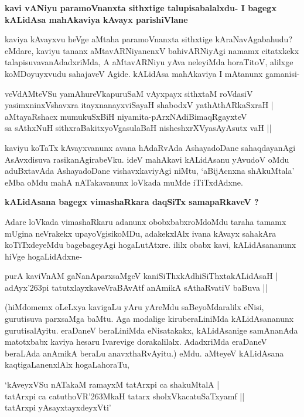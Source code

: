 \newpage
{\noindent
{\large\bf kavi vANiyu paramoVnanxta sithxtige talupisabalalxdu- I bagegx kALidAsa mahAkaviya kAvayx pari\-shiVlane}}\label{page232}
\medskip

\noindent
kaviya kAvayxvu heVge aMtaha paramoVnanxta sithxtige kAraNavAgabahudu? eMdare, kaviyu tananx aMta\-vARNiyanenxV bahivARNiyAgi namamx citatxkekx talapisuvavanAdadxriMda, A aMtavARNiyu yAva nele\-yiMda horaTitoV, alilxge koMDoyuyxvudu sahajaveV Agide. kALidAsa mahAkaviya I mAtanunx gamanisi-

\begin{shloka}
veVdAMteVSu yamAhureVkapuruSaM vAyxpayx sithxtaM roVdasiV\\\label{232}
yasimxninxVshavxra itayxnanayxviSayaH shabodxV yathAthARkaSxraH |\\
aMtayaRshacx mumukuSxBiH niyamita-pArxNAdiBimaqRgayxteV \\
sa sAthxNuH sithxraBakitxyoVgasulaBaH nisheshxrXVyasAyAsutx vaH ||
\end{shloka}

kaviyu koTaTx kAvayxvanunx avana hAdaRvAda AshayadoDane sahaqdayanAgi AsAvxdisuva rasika\-nAgira\-beVku. ideV mahAkavi kALidAsanu yAvudoV oMdu aduBxtavAda AshayadoDane vishavxkavi\-yAgi niMtu, `aBijAcnxna shAkuMtala' eMba oMdu mahA nATakavanunx loVkada muMde iTiTxdAdxne.

{\bigskip
\noindent
{\large\bf kALidAsana bagegx vimashaRkara daqSiTx samapaRkaveV ?}}
\medskip

\noindent
Adare loVkada vimashaRkaru adanunx obobxbabxroMdoMdu taraha tamamx mUgina neVrakekx upa\-yoVgisikoMDu, adakekxlAlx ivana kAvayx sahakAra koTiTxdeyeMdu bagebageyAgi hogaLutAtxre. ililx obabx kavi, kALidAsananunx hiVge hogaLidAdxne-

\begin{shloka}
purA kaviVnAM gaNanAparxsaMgeV kaniSiThxkAdhiSiThxtakALidAsaH |\\\label{233}
adAyx\char'263pi tatutxlayxkaveVraBAvAtf anAmikA sAthaRvatiV baBuva ||
\end{shloka}

\noindent
(hiMdomemx oLeLxya kavigaLu yAru yAreMdu saBeyoMdaralilx eNisi, gurutisuva parxsaMga baMtu. Aga modalige kiruberaLiniMda kALidAsananunx gurutisalAyitu. eraDaneV beraLiniMda eNisa\-takakx, kALidAsanige samAnanAda matotxbabx kaviya hesaru Ivarevige dorakalilalx. AdadxriMda eraDaneV beraLAda anAmikA beraLu anavxthaRvAyitu.) eMdu. aMteyeV kALidAsana kaqtigaLanenxlAlx hogaLa\-horaTu,

\begin{shloka}
`kAveyxVSu nATakaM ramayxM tatArxpi ca shakuMtalA |\\\label{233}
tatArxpi ca catuthoVR\char'263MkaH tatarx sholxVkacatuSaTxyamf ||\\
tatArxpi yAsayxtayxdeyxVti'
\end{shloka}

